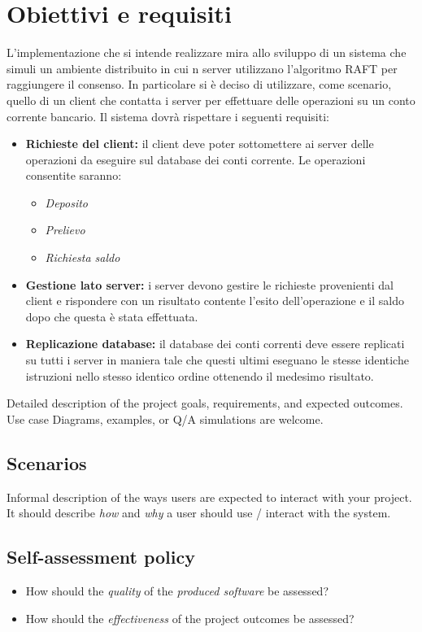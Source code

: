 \section{Obiettivi e requisiti}
	L'implementazione che si intende realizzare mira allo sviluppo di un sistema che simuli un ambiente distribuito in cui n server utilizzano l'algoritmo RAFT per raggiungere il consenso. In particolare si è deciso di utilizzare, come scenario, quello di un client che contatta i server per effettuare delle operazioni su un conto corrente bancario.
	Il sistema dovrà rispettare i seguenti requisiti:
		\begin{itemize}
			\item \textbf{Richieste del client:} il client deve poter sottomettere ai server delle operazioni da eseguire sul database dei conti corrente. Le operazioni consentite saranno:
				\begin{itemize}
					\item \emph{Deposito}
					\item \emph{Prelievo}
					\item \emph{Richiesta saldo}
				\end{itemize}
			\item \textbf{Gestione lato server:} i server devono gestire le richieste provenienti dal client e rispondere con un risultato contente l'esito dell'operazione e il saldo dopo che questa è stata effettuata.
			\item \textbf{Replicazione database:} il database dei conti correnti deve essere replicati su tutti i server in maniera tale che questi ultimi eseguano le stesse identiche istruzioni nello stesso identico ordine ottenendo il medesimo risultato.
		\end{itemize}

	Detailed description of the project goals, requirements, and expected outcomes.
	Use case Diagrams, examples, or Q/A simulations are welcome.

	\subsection{Scenarios}

	Informal description of the ways users are expected to interact with your project.
	It should describe \emph{how} and \emph{why} a user should use / interact with the system.

	\subsection{Self-assessment policy}

	\begin{itemize}
	    \item How should the \emph{quality} of the \emph{produced software} be assessed?
	    
	    \item How should the \emph{effectiveness} of the project outcomes be assessed?
	\end{itemize}